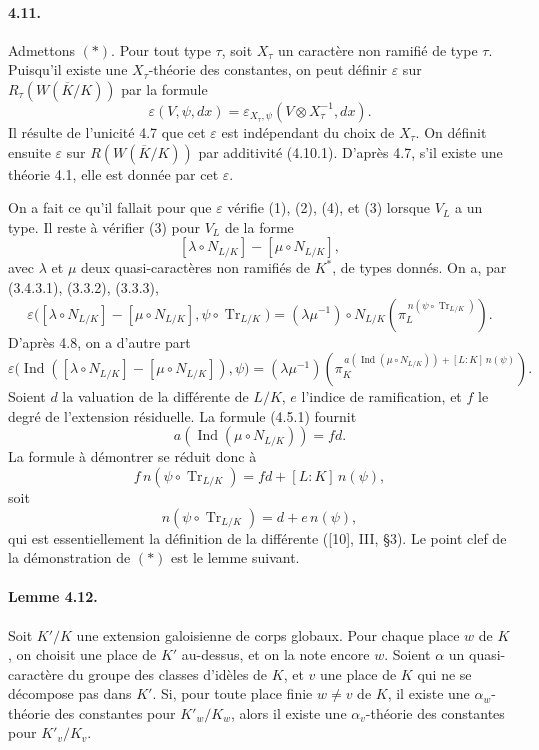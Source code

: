\documentclass[10pt]{article}
\newcommand{\Ind}{\operatorname{Ind}}
\newcommand{\Tr}{\operatorname{Tr}}
\providecommand{\Tr}{\operatorname{Tr}}
\providecommand{\Tr}{\operatorname{Tr}}
\providecommand{\Tr}{\operatorname{Tr}}
\providecommand{\Ind}{\operatorname{Ind}}
\begin{document}
\paragraph{4.11.} Admettons \((*)\). Pour tout type \(\tau\), soit \(X_\tau\) un caractère non ramifié de type \(\tau\). Puisqu'il existe une \(X_\tau\)-théorie des constantes, on peut définir \(\varepsilon\) sur \(R_\tau(W(\overline K/K))\) par la formule
\[
\varepsilon(V,\psi,dx)=
\varepsilon_{X_\tau,\psi}(V\otimes X_\tau^{-1},dx).
\]
Il résulte de l'unicité 4.7 que cet \(\varepsilon\) est indépendant du choix de \(X_\tau\). On définit ensuite \(\varepsilon\) sur \(R(W(\overline K/K))\) par additivité (4.10.1). D'après 4.7, s'il existe une théorie 4.1, elle est donnée par cet \(\varepsilon\).

On a fait ce qu'il fallait pour que \(\varepsilon\) vérifie (1), (2), (4), et (3) lorsque \(V_L\) a un type. Il reste à vérifier (3) pour \(V_L\) de la forme
\[
[\lambda\circ N_{L/K}]-[\mu\circ N_{L/K}],
\]
avec \(\lambda\) et \(\mu\) deux quasi-caractères non ramifiés de \(K^*\), de types donnés. On a, par (3.4.3.1), (3.3.2), (3.3.3),
\[
\varepsilon\bigl([\lambda\circ N_{L/K}]-[\mu\circ N_{L/K}],
\psi\circ\Tr_{L/K}\bigr)
=
(\lambda\mu^{-1})\circ N_{L/K}
\left(\pi_L^{\,n(\psi\circ\Tr_{L/K})}\right).
\]
D'après 4.8, on a d'autre part
\[
\varepsilon\bigl(\Ind([\lambda\circ N_{L/K}]-[\mu\circ N_{L/K}]),\psi\bigr)
=
(\lambda\mu^{-1})
\left(\pi_K^{\,a(\Ind(\mu\circ N_{L/K}))+[L:K]\,n(\psi)}\right).
\]
Soient \(d\) la valuation de la différente de \(L/K\), \(e\) l'indice de ramification, et \(f\) le degré de l'extension résiduelle. La formule (4.5.1) fournit
\[
a(\Ind(\mu\circ N_{L/K}))=fd.
\]
La formule à démontrer se réduit donc à
\[
f\,n(\psi\circ\Tr_{L/K})=fd+[L:K]\,n(\psi),
\]
soit
\[
n(\psi\circ\Tr_{L/K})=d+e\,n(\psi),
\]
qui est essentiellement la définition de la différente ([10], III, §3). Le point clef de la démonstration de \((*)\) est le lemme suivant.

\paragraph{Lemme 4.12.} Soit \(K'/K\) une extension galoisienne de corps globaux. Pour chaque place \(w\) de \(K\), on choisit une place de \(K'\) au-dessus, et on la note encore \(w\). Soient \(\alpha\) un quasi-caractère du groupe des classes d'idèles de \(K\), et \(v\) une place de \(K\) qui ne se décompose pas dans \(K'\). Si, pour toute place finie \(w\ne v\) de \(K\), il existe une \(\alpha_w\)-théorie des constantes pour \(K'_w/K_w\), alors il existe une \(\alpha_v\)-théorie des constantes pour \(K'_v/K_v\).
\end{document}
